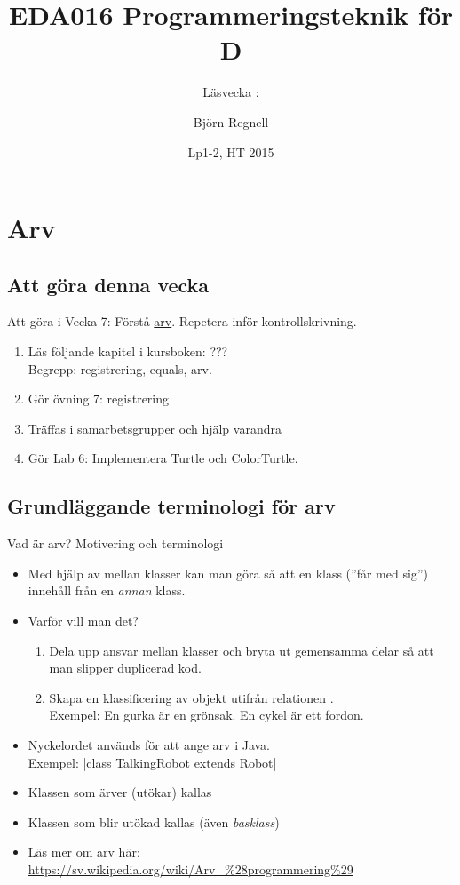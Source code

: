 \documentclass{lecturenotes}
\title[Föreläsningsanteckningar EDA016, 2015]{EDA016 Programmeringsteknik för D}
\subtitle{Läsvecka \vecka: \tema}
\author{Björn Regnell}
\institute{Datavetenskap, LTH}
\date{Lp1-2, HT 2015}
\renewcommand{\vecka}{7}
\newcommand{\tema}{Arv}
\begin{document}
\frame{\titlepage}
\setnextsection{\vecka}
\section[Vecka \vecka: \tema]{\tema}
\frame{\tableofcontents}

\subsection{Att göra denna vecka}
\begin{Slide}{Att göra i Vecka \vecka: Förstå \href{https://sv.wikipedia.org/wiki/Arv_\%28programmering\%29}{arv}. Repetera inför kontrollskrivning.}
\begin{enumerate}
\item Läs följande kapitel i kursboken: ??? \\  
Begrepp: registrering, equals, arv.
\item Gör övning 7: registrering
\item Träffas i samarbetsgrupper och hjälp varandra 
\item Gör Lab 6: Implementera Turtle och ColorTurtle.
\end{enumerate}
\end{Slide}

\subsection{Grundläggande terminologi för arv}
\begin{Slide}{Vad är arv? Motivering och terminologi}\footnotesize
\begin{itemize}
\item Med hjälp av  mellan klasser kan man göra så att en klass  (''får med sig'') innehåll från en \textit{annan} klass.
\item Varför vill man det? 
\begin{enumerate}\footnotesize
\item Dela upp ansvar mellan klasser och bryta ut gemensamma delar så att man slipper duplicerad kod.
\item Skapa en klassificering av objekt utifrån relationen  .  \\ Exempel: En gurka är en grönsak. En cykel är ett fordon. 
\end{enumerate}
\item Nyckelordet  används för att ange arv i Java. \\ Exempel:   \code|class TalkingRobot extends Robot|
\item Klassen som ärver (utökar) kallas 
\item Klassen som blir utökad kallas  (även \textit{basklass})
\item Läs mer om arv  här: \scriptsize \url{https://sv.wikipedia.org/wiki/Arv\_\%28programmering\%29} 

\end{itemize}
\end{Slide}
\end{document}
